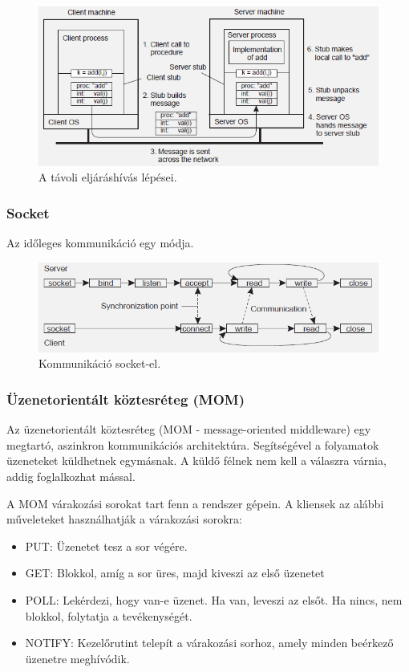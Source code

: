 \documentclass[margin=0px]{article}
\begin{document}
\begin{figure}[H]
    \centering
    \includegraphics[width=0.8\linewidth]{img/rpc}
    \caption{A távoli eljáráshívás lépései.}
    \label{fig:rpc}
\end{figure}

\subsubsection{Socket}

Az időleges kommunikáció egy módja.

\begin{figure}[H]
    \centering
    \includegraphics[width=0.8\linewidth]{img/socket}
    \caption{Kommunikáció socket-el.}
    \label{fig:socket}
\end{figure}

\subsubsection{Üzenetorientált köztesréteg (MOM)}

Az üzenetorientált köztesréteg (MOM - message-oriented middleware) egy megtartó, aszinkron kommunikációs architektúra.
Segítségével a folyamatok üzeneteket küldhetnek egymásnak. A küldő félnek nem kell a válaszra várnia, addig
foglalkozhat mással.

A MOM várakozási sorokat tart fenn a rendszer gépein. A kliensek az alábbi műveleteket
használhatják a várakozási sorokra:

\begin{itemize}
    \item	PUT: Üzenetet tesz a sor végére.
    \item	GET: Blokkol, amíg a sor üres, majd kiveszi az első üzenetet
    \item	POLL: Lekérdezi, hogy van-e üzenet. Ha van, leveszi az elsőt.
          Ha nincs, nem blokkol, folytatja a tevékenységét.
    \item	NOTIFY: Kezelőrutint telepít a várakozási sorhoz, amely minden
          beérkező üzenetre meghívódik.
\end{itemize}
\end{document}
